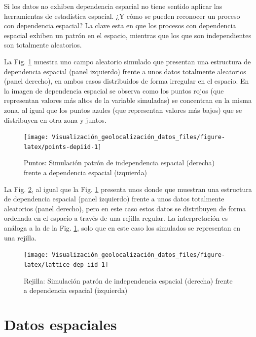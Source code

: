 \documentclass[
]{book}
\theoremstyle{definition}
\theoremstyle{definition}
\theoremstyle{definition}
\theoremstyle{definition}
\theoremstyle{remark}
\begin{document}
Si los datos no exhiben dependencia espacial no tiene sentido aplicar las
herramientas de estadística espacial. ¿Y cómo se pueden reconocer un proceso con
dependencia espacial? La clave esta en que los procesos con dependencia espacial
exhiben un patrón en el espacio, mientras que los que son independientes son
totalmente aleatorios.

La Fig. \ref{fig:points-depiid} muestra uno campo aleatorio simulado que
presentan una estructura de dependencia espacial (panel izquierdo) frente a unos
datos totalmente aleatorios (panel derecho), en ambos casos distribuidos de
forma irregular en el espacio. En la imagen de dependencia espacial se observa
como los puntos rojos (que representan valores más altos de la variable
simuladas) se concentran en la misma zona, al igual que los puntos azules (que
representan valores más bajos) que se distribuyen en otra zona y juntos.

\begin{figure}

{\centering \texttt{[image: Visualización\_geolocalización\_datos\_files/figure-latex/points-depiid-1]} 

}

\caption{Puntos: Simulación patrón de independencia espacial (derecha) frente a dependencia espacial (izquierda)}\label{fig:points-depiid}
\end{figure}

La Fig. \ref{fig:lattice-dep-iid}, al igual que la Fig.
\ref{fig:points-depiid} presenta unos  donde que muestran una
estructura de dependencia espacial (panel izquierdo) frente a unos datos
totalmente aleatorios (panel derecho), pero en este caso estos datos se
distribuyen de forma ordenada en el espacio a través de una rejilla regular. La
interpretación es análoga a la de la Fig. \ref{fig:points-depiid}, solo que en
este caso los  simulados se representan en una rejilla.

\begin{figure}

{\centering \texttt{[image: Visualización\_geolocalización\_datos\_files/figure-latex/lattice-dep-iid-1]} 

}

\caption{Rejilla: Simulación patrón de independencia espacial (derecha) frente a dependencia espacial (izquierda)}\label{fig:lattice-dep-iid}
\end{figure}

\hypertarget{datos-espaciales}{%
\section{Datos espaciales}\label{datos-espaciales}}
\end{document}
